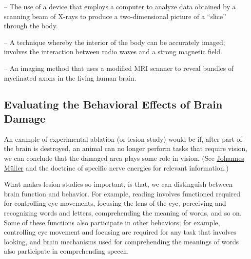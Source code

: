 \begin{coloredlist}
    \item {} -- The use of a device that employs a computer to analyze data obtained by a scanning beam of X-rays to produce a two-dimensional picture of a ``slice'' through the body. 
    \item {} -- A technique whereby the interior of the body can be accurately imaged; involves the interaction between radio waves and a strong magnetic field.
    \item {} -- An imaging method that uses a modified MRI scanner to reveal bundles of myelinated axons in the living human brain.
\end{coloredlist}

\subsection{Evaluating the Behavioral Effects of Brain Damage}

An example of experimental ablation (or lesion study) would be if, after part of the brain is destroyed, an animal can no longer perform tasks that require vision, we can conclude that the damaged area plays some role in vision. (See \hyperlink{person:Muller}{Johannes M\"uller} and the doctrine of specific nerve energies for relevant information.)

What makes lesion studies so important, is that, we can distinguish between brain function and behavior. For example, reading involves functioned required for controlling eye movements, focusing the lens of the eye, perceiving and recognizing words and letters, comprehending the meaning of words, and so on. Some of these functions also participate in other behaviors; for example, controlling eye movement and focusing are required for any task that involves looking, and brain mechanisms used for comprehending the meanings of words also participate in comprehending speech.